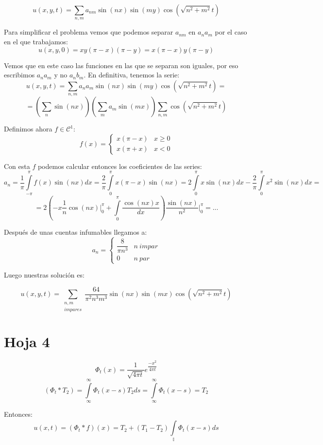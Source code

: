 \documentclass[openany]{book}
\begin{document}
\begin{example}
  $$ u(x,y,t) = \sum\limits_{n,m}^{}a_{nm}\sin(nx)\sin(my) \cos(\sqrt{n^2+m^2}t) $$

  Para simplificar el problema vemos que podemos separar $ a_{nm} $ en $ a_na_m $ por el caso en el que trabajamos:
  $$ u(x,y,0) = xy(\pi-x)(\pi-y) = x(\pi-x)y(\pi-y) $$

  Vemos que en este caso las funciones en las que se separan son iguales, por eso escribimos $ a_na_m $ y no $ a_nb_m $. En definitiva, tenemos la serie:
  $$ u(x,y,t) =  \sum\limits_{n,m}^{} a_na_m \sin(nx) \sin(my) \cos(\sqrt{n^2+m^2}t) = $$ 
  $$ =\left( \sum\limits_{n}^{}\sin(nx) \right) \left( \sum\limits_{m}^{}a_m \sin(mx) \right) \sum\limits_{n,m}^{} \cos(\sqrt{n^2+m^2}t) $$

  Definimos ahora $ f \in \mathcal{C}^1$:
  $$ f(x) = \left\{
  \begin{array}{ll}
    x(\pi-x) & x\geq 0 \\ 
    x(\pi+x) & x<0
  \end{array}
  \right. $$
  
  Con esta $ f $ podemos calcular entonces los coeficientes de las series:
  $$ a_n = \dfrac{1}{\pi} \int\limits_{-\pi}^{\pi}f(x) \sin(nx)dx = \dfrac{2}{\pi} \int\limits_{0}^{\pi}x (\pi-x)\sin(nx) = 2 \int\limits_{0}^{\pi}x \sin(nx)dx -\dfrac{2}{\pi} \int\limits_{0}^{\pi}x^2 \sin(nx)dx = $$
  $$  = 2 \left( -x \dfrac{1}{n}\cos(nx) \Biggr|_{0}^{\pi} + \int\limits_{0}^{\pi} \dfrac{\cos(nx)x}{dx} \right) \dfrac{\sin(nx)}{n^2} \Biggr|_{0}^{\pi}  = ...$$

  Después de unas cuentas infumables llegamos a:
  $$ a_n = \left\{
  \begin{array}{ll}
    \dfrac{8}{\pi n^3} & n\ impar\\ 
    0 & n\ par
  \end{array}
  \right. $$
  
  Luego nuestras solución es:

  $$ u(x,y,t) = \sum\limits _{\substack{n,m\\ impares}}^{} \dfrac{64}{\pi^2n ^3m^3} \sin(nx)\sin(mx)\cos(\sqrt{n^2+m^2}t) $$

\end{example}

\section{Hoja 4}

\setcounter{ex}{0}

\begin{exercise}
  $$ \Phi _{t} (x) = \dfrac{1}{\sqrt{4 \pi t}}e^{\dfrac{-x^2}{4\pi t}} $$
  $$  (\Phi_{t} * T_2) = \int\limits_{\infty}^{\infty} \Phi_{t}(x-s)T_2ds = \int\limits_{\infty}^{\infty} \Phi_{t}(x-s) = T_2 $$

  Entonces:
  $$ u(x,t) = (\Phi_{t} * f)(x) = T_2+(T_1-T_2) \int\limits_{\mathbb{I}}^{} \Phi_{t}(x-s)ds $$


\end{exercise}
\end{document}
